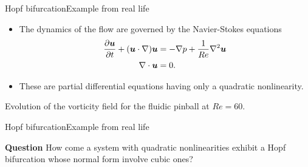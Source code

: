 \documentclass[usenames,dvipsnames,svgnames,10pt,aspectratio=169]{beamer}
\begin{document}
\begin{frame}[t, c]{Hopf bifurcation}{Example from real life}
	\begin{minipage}{0.48\textwidth}
		\begin{itemize}
			\item The dynamics of the flow are governed by the Navier-Stokes equations
			\begin{equation}
				\begin{aligned}
					\displaystyle \frac{\partial {\bm u}}{\partial t} + ({\bm u} \cdot \nabla ) {\bm u} & = - \nabla p + \frac{1}{Re}\nabla^2 {\bm u}\\
					\nabla \cdot {\bm u} & = 0.
				\end{aligned}
				\notag
			\end{equation}

			\item These are partial differential equations having only a quadratic nonlinearity.

		\end{itemize}
	\end{minipage}%
	\hfill
	\begin{minipage}{0.48\textwidth}
		\begin{center}
		\end{center}

		{\small Evolution of the vorticity field for the fluidic pinball at $Re=60$.}
	\end{minipage}

	\vspace{1cm}
\end{frame}

\begin{frame}[t, c]{Hopf bifurcation}{Example from real life}
	\begin{block}{\centering \textbf{Question}}
		\centering
		How come a system with quadratic nonlinearities exhibit a Hopf bifurcation whose normal form involve cubic ones?
	\end{block}

	\vspace{1cm}
\end{frame}
\end{document}
